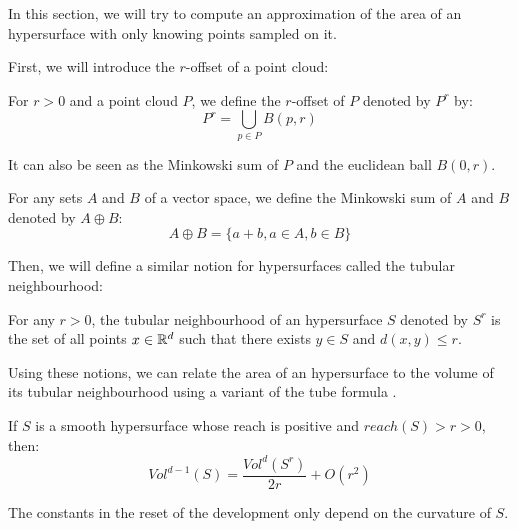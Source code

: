 In this section, we will try to compute an approximation of the area of an
hypersurface with only knowing points sampled on it.

First, we will introduce the $r$-offset of a point cloud:

\begin{definition}
    For $ r > 0 $ and a point cloud $ P $, we define the $r$-offset of $ P $
    denoted by $ P^r $ by:
    $$ P^r = \bigcup_{p \in P} B(p, r)$$
\end{definition}

It can also be seen as the Minkowski sum of $ P $ and the euclidean ball $ B(0,
r) $.

\begin{definition}
    For any sets $ A $ and $ B $ of a vector space, we define the Minkowski sum
    of $ A $ and $ B $ denoted by $ A \oplus B $:
    $$ A \oplus B = \{ a + b, a \in A, b \in B \} $$
\end{definition}

Then, we will define a similar notion for hypersurfaces called the tubular
neighbourhood:

\begin{definition}
    For any $ r > 0 $, the tubular neighbourhood of an hypersurface $ S $
    denoted by $ S^r $ is the set of all points $ x \in \mathbb{R}^d $ such that there
    exists $ y \in S $ and $ d(x, y) \leq r $.
\end{definition}

Using these notions, we can relate the area of an hypersurface to the volume of
its tubular neighbourhood using a variant of the tube formula \cite{weyl1939volume}.

\begin{proposition}
    \label{prop:comp-offset-area}
    If $ S $ is a smooth hypersurface whose reach is positive and $ reach(S) > r
    > 0 $, then: $$ Vol^{d-1}(S) = \frac{Vol^d(S^r)}{2r} + O(r^2) $$

    The constants in the reset of the development only depend on the curvature
    of $ S $.
\end{proposition}

